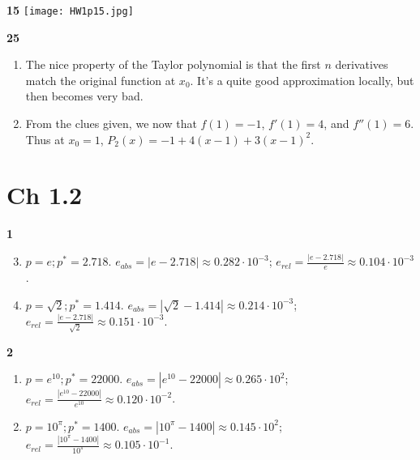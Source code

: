 \documentclass{article}
\newcommand{\abs}[1]{\left| #1 \right|}
\begin{document}

\textbf{15}
\texttt{[image: HW1p15.jpg]}

\textbf{25} %
\begin{enumerate}
    \item 
    The nice property of the Taylor polynomial is that the first $n$ derivatives match the original function at $x_0$. It's a quite good approximation locally, but then becomes very bad.

    \item  %
    From the clues given, we now that $f(1) = -1$, $f'(1) = 4$, and $f''(1) = 6$. Thus at $x_0 = 1$, $P_2(x) = -1 + 4(x - 1) + 3(x - 1)^2$.
\end{enumerate}



\section{Ch 1.2}

\textbf{1} %
\begin{enumerate}
    \setcounter{enumi}{2}

    \item 
    $p = e; p^* = 2.718$. $e_{abs} = \abs{e - 2.718} \approx 0.282 \cdot 10^{-3}$; $e_{rel} = \frac{\abs{e - 2.718}}{e} \approx 0.104 \cdot 10^{-3}$.

    \item
    $p = \sqrt{2}; p^* = 1.414$. $e_{abs} = \abs{\sqrt{2} - 1.414} \approx 0.214 \cdot 10^{-3}$; $e_{rel} = \frac{\abs{e - 2.718}}{\sqrt{2}} \approx 0.151 \cdot 10^{-3}$.
\end{enumerate}


\textbf{2} %
\begin{enumerate}
    \item 
    $p = e^{10}; p^* = 22000$. $e_{abs} = \abs{e^{10} - 22000} \approx 0.265 \cdot 10^{2}$; $e_{rel} = \frac{\abs{e^{10} - 22000}}{e^{10}} \approx 0.120 \cdot 10^{-2}$.

    \item 
    $p = 10^{\pi}; p^* = 1400$. $e_{abs} = \abs{10^{\pi} - 1400} \approx 0.145 \cdot 10^{2}$; $e_{rel} = \frac{\abs{10^{\pi} - 1400}}{10^{\pi}} \approx 0.105 \cdot 10^{-1}$.
\end{enumerate}
\end{document}
